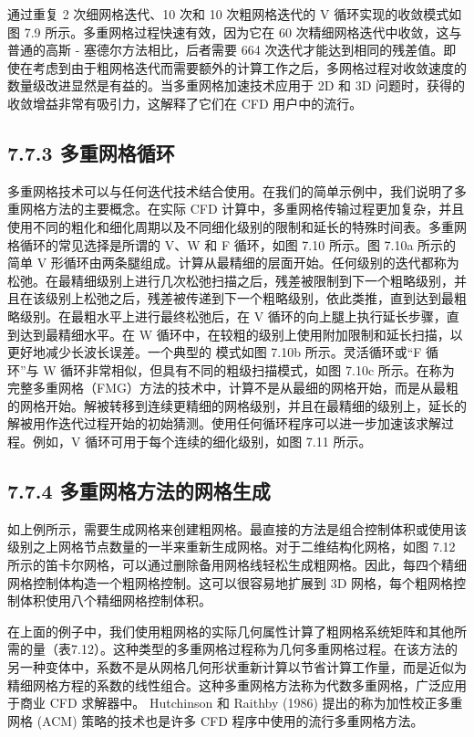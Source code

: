 \documentclass[11pt,a4paper,openany,fontset=none]{ctexbook}
\begin{document}
通过重复 2 次细网格迭代、10 次和 10 次粗网格迭代的 V 循环实现的收敛模式如图 7.9 所示。多重网格过程快速有效，因为它在 60 次精细网格迭代中收敛，这与普通的高斯 - 塞德尔方法相比，后者需要 664 次迭代才能达到相同的残差值。即使在考虑到由于粗网格迭代而需要额外的计算工作之后，多网格过程对收敛速度的数量级改进显然是有益的。当多重网格加速技术应用于 2D 和 3D 问题时，获得的收敛增益非常有吸引力，这解释了它们在 CFD 用户中的流行。

\subsection*{7.7.3 多重网格循环}

多重网格技术可以与任何迭代技术结合使用。在我们的简单示例中，我们说明了多重网格方法的主要概念。在实际 CFD 计算中，多重网格传输过程更加复杂，并且使用不同的粗化和细化周期以及不同细化级别的限制和延长的特殊时间表。多重网格循环的常见选择是所谓的 V、W 和 F 循环，如图 7.10 所示。图 7.10a 所示的简单 V 形循环由两条腿组成。计算从最精细的层面开始。任何级别的迭代都称为松弛。在最精细级别上进行几次松弛扫描之后，残差被限制到下一个粗略级别，并且在该级别上松弛之后，残差被传递到下一个粗略级别，依此类推，直到达到最粗略级别。在最粗水平上进行最终松弛后，在 V 循环的向上腿上执行延长步骤，直到达到最精细水平。在 W 循环中，在较粗的级别上使用附加限制和延长扫描，以更好地减少长波长误差。一个典型的
模式如图 7.10b 所示。灵活循环或“F 循环”与 W 循环非常相似，但具有不同的粗级扫描模式，如图 7.10c 所示。在称为完整多重网格（FMG）方法的技术中，计算不是从最细的网格开始，而是从最粗的网格开始。解被转移到连续更精细的网格级别，并且在最精细的级别上，延长的解被用作迭代过程开始的初始猜测。使用任何循环程序可以进一步加速该求解过程。例如，V 循环可用于每个连续的细化级别，如图 7.11 所示。

\subsection*{7.7.4 多重网格方法的网格生成}

如上例所示，需要生成网格来创建粗网格。最直接的方法是组合控制体积或使用该级别之上网格节点数量的一半来重新生成网格。对于二维结构化网格，如图 7.12 所示的笛卡尔网格，可以通过删除备用网格线轻松生成粗网格。因此，每四个精细网格控制体构造一个粗网格控制。这可以很容易地扩展到 3D 网格，每个粗网格控制体积使用八个精细网格控制体积。

在上面的例子中，我们使用粗网格的实际几何属性计算了粗网格系统矩阵和其他所需的量（表7.12）。这种类型的多重网格过程称为几何多重网格过程。在该方法的另一种变体中，系数不是从网格几何形状重新计算以节省计算工作量，而是近似为精细网格方程的系数的线性组合。这种多重网格方法称为代数多重网格，广泛应用于商业 CFD 求解器中。 Hutchinson 和 Raithby (1986) 提出的称为加性校正多重网格 (ACM) 策略的技术也是许多 CFD 程序中使用的流行多重网格方法。
\end{document}
